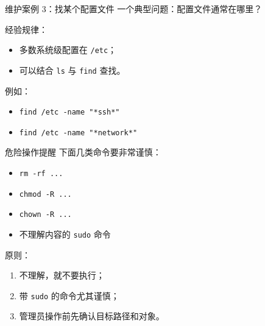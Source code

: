 \documentclass[aspectratio=169]{beamer}
\begin{document}
\begin{frame}{维护案例 3：找某个配置文件}
一个典型问题：配置文件通常在哪里？

\vspace{0.5em}
经验规律：
\begin{itemize}
  \item 多数系统级配置在 \texttt{/etc}；
  \item 可以结合 \texttt{ls} 与 \texttt{find} 查找。
\end{itemize}

\vspace{0.5em}
例如：
\begin{itemize}
  \item \texttt{find /etc -name "*ssh*"}
  \item \texttt{find /etc -name "*network*"}
\end{itemize}
\end{frame}

\begin{frame}{危险操作提醒}
下面几类命令要非常谨慎：
\begin{itemize}
  \item \texttt{rm -rf ...}
  \item \texttt{chmod -R ...}
  \item \texttt{chown -R ...}
  \item 不理解内容的 \texttt{sudo} 命令
\end{itemize}

\vspace{0.5em}
原则：
\begin{enumerate}
  \item 不理解，就不要执行；
  \item 带 \texttt{sudo} 的命令尤其谨慎；
  \item 管理员操作前先确认目标路径和对象。
\end{enumerate}
\end{frame}


\end{document}
